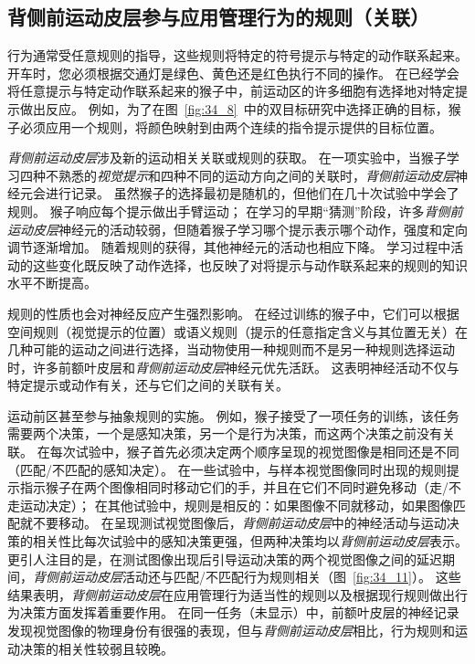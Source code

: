 \subsection{背侧前运动皮层参与应用管理行为的规则（关联）}

行为通常受任意规则的指导，这些规则将特定的符号提示与特定的动作联系起来。
开车时，您必须根据交通灯是绿色、黄色还是红色执行不同的操作。
在已经学会将任意提示与特定动作联系起来的猴子中，前运动区的许多细胞有选择地对特定提示做出反应。
例如，为了在图~\ref{fig:34_8}~中的双目标研究中选择正确的目标，猴子必须应用一个规则，将颜色映射到由两个连续的指令提示提供的目标位置。


\textit{背侧前运动皮层}涉及新的运动相关关联或规则的获取。
在一项实验中，当猴子学习四种不熟悉的\textit{视觉提示}和四种不同的运动方向之间的关联时，\textit{背侧前运动皮层}神经元会进行记录。
虽然猴子的选择最初是随机的，但他们在几十次试验中学会了规则。
猴子响应每个提示做出手臂运动；
在学习的早期“猜测”阶段，许多\textit{背侧前运动皮层}神经元的活动较弱，但随着猴子学习哪个提示表示哪个动作，强度和定向调节逐渐增加。
随着规则的获得，其他神经元的活动也相应下降。
学习过程中活动的这些变化既反映了动作选择，也反映了对将提示与动作联系起来的规则的知识水平不断提高。


规则的性质也会对神经反应产生强烈影响。
在经过训练的猴子中，它们可以根据空间规则（视觉提示的位置）或语义规则（提示的任意指定含义与其位置无关）在几种可能的运动之间进行选择，当动物使用一种规则而不是另一种规则选择运动时，许多前额叶皮层和\textit{背侧前运动皮层}神经元优先活跃。
这表明神经活动不仅与特定提示或动作有关，还与它们之间的关联有关。


运动前区甚至参与抽象规则的实施。
例如，猴子接受了一项任务的训练，该任务需要两个决策，一个是感知决策，另一个是行为决策，而这两个决策之前没有关联。
在每次试验中，猴子首先必须决定两个顺序呈现的视觉图像是相同还是不同（匹配/不匹配的感知决定）。
在一些试验中，与样本视觉图像同时出现的规则提示指示猴子在两个图像相同时移动它们的手，并且在它们不同时避免移动（走/不走运动决定）；
在其他试验中，规则是相反的：如果图像不同就移动，如果图像匹配就不要移动。
在呈现测试视觉图像后，\textit{背侧前运动皮层}中的神经活动与运动决策的相关性比每次试验中的感知决策更强，但两种决策均以\textit{背侧前运动皮层}表示。
更引人注目的是，在测试图像出现后引导运动决策的两个视觉图像之间的延迟期间，\textit{背侧前运动皮层}活动还与匹配/不匹配行为规则相关（图~\ref{fig:34_11}）。
这些结果表明，\textit{背侧前运动皮层}在应用管理行为适当性的规则以及根据现行规则做出行为决策方面发挥着重要作用。
在同一任务（未显示）中，前额叶皮层的神经记录发现视觉图像的物理身份有很强的表现，但与\textit{背侧前运动皮层}相比，行为规则和运动决策的相关性较弱且较晚。


